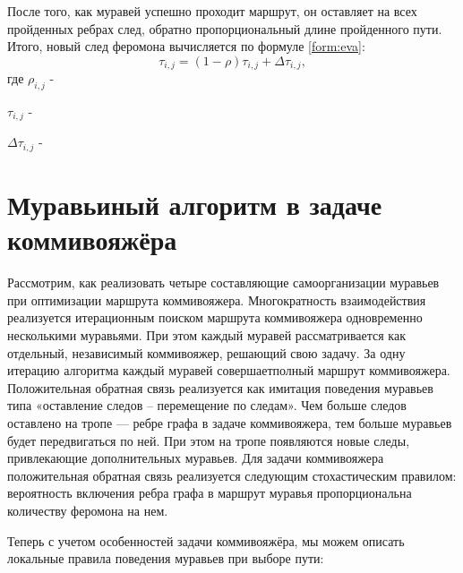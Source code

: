 \documentclass[a4paper,12pt]{report}
\begin{document}
   			\vspace{0.5cm}
   			После того, как муравей успешно проходит маршрут, он оставляет на всех пройденных ребрах след, обратно пропорциональный длине пройденного пути. Итого, новый след феромона вычисляется по формуле \ref{form:eva}:
   			\begin{equation}\label{form:eva} 
   			\tau _{i,j}=(1-\rho )\tau _{i,j}+\Delta \tau _{i,j},
   			\end{equation}
   			где \quad$ \rho _{i,j}$ -  
   			
   			$\tau _{i,j}$ -  
   			
   			$\Delta \tau _{i,j}$ - 
   	
   		\newpage
   	
   		\section{Муравьиный алгоритм в задаче коммивояжёра}

   			Рассмотрим, как реализовать четыре составляющие самоорганизации муравьев при оптимизации маршрута коммивояжера. 
   			Многократность взаимодействия реализуется итерационным поиском маршрута коммивояжера одновременно несколькими муравьями. 
   			При этом каждый муравей рассматривается как отдельный, независимый коммивояжер, решающий свою задачу. 
   			За одну итерацию алгоритма каждый муравей совершаетполный маршрут коммивояжера. 
   			Положительная обратная связь реализуется как имитация поведения муравьев типа «оставление следов – перемещение по следам». 
   			Чем больше следов оставлено на тропе — ребре графа в задаче коммивояжера, тем больше муравьев будет передвигаться по ней. 
   			При этом на тропе появляются новые следы, привлекающие дополнительных муравьев. 
   			Для задачи коммивояжера положительная обратная связь реализуется следующим стохастическим правилом: вероятность включения ребра графа в маршрут муравья пропорциональна количеству феромона на нем.
   			
   			\vspace{0.5cm}
   			Теперь с учетом особенностей задачи коммивояжёра, мы можем описать локальные правила поведения муравьев при выборе пути:\
   			
\end{document}
